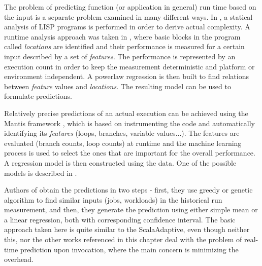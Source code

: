 The problem of predicting function (or application in general) run time based on the input is a separate problem examined in many different ways. In \cite{wegbreit_mechanical_1975}, a statical analysis of LISP programs is performed in order to derive actual complexity. A runtime analysis approach was taken in \cite{goldsmith_measuring_2007}, where basic blocks in the program called \textit{locations} are identified and their performance is measured for a certain input described by a set of \textit{features}. The performance is represented by an execution count in order to keep the measurement deterministic and platform or environment independent. A powerlaw regression is then built to find relations between \textit{feature} values and \textit{locations}. The resulting model can be used to formulate predictions.

Relatively precise predictions of an actual execution can be achieved using the Mantis framework \cite{chun_mantis:_2010}, which is based on instrumenting the code and automatically identifying its \textit{features} (loops, branches, variable values...). The features are evaluated (branch counts, loop counts) at runtime and the machine learning process is used to select the ones that are important for the overall performance. A regression model is then constructed using the data. One of the possible models is described in \cite{huang_predicting_2010}.

Authors of \cite{smith_predicting_1998} obtain the predictions in two steps - first, they use greedy or genetic algorithm to find similar inputs (jobs, workloads) in the historical run measurement, and then, they generate the prediction using either simple mean or a linear regression, both with corresponding confidence interval. The basic approach taken here is quite similar to the ScalaAdaptive, even though neither this, nor the other works referenced in this chapter deal with the problem of real-time prediction upon invocation, where the main concern is minimizing the overhead.